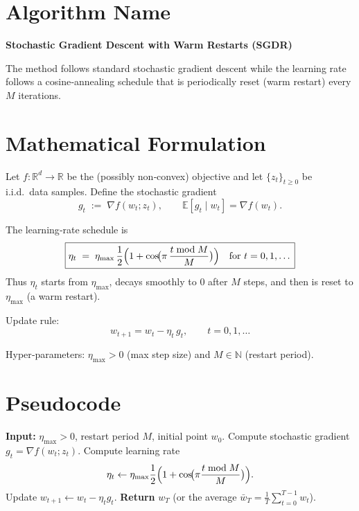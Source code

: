 \documentclass{article}
\newcommand{\EE}{\mathbb{E}}
\newcommand{\RR}{\mathbb{R}}
\begin{document}
\section*{Algorithm Name}
\textbf{Stochastic Gradient Descent with Warm Restarts (SGDR)}  

The method follows standard stochastic gradient descent while the learning rate follows a cosine‑annealing schedule that is periodically reset (warm restart) every $M$ iterations.

\section*{Mathematical Formulation}
Let $f:\RR^{d}\!\to\!\RR$ be the (possibly non‑convex) objective and let $\{z_t\}_{t\ge 0}$ be i.i.d.\ data samples.  
Define the stochastic gradient
\[
g_t \;:=\; \nabla f(w_t;z_t),\qquad 
\EE\!\left[g_t\mid w_t\right]=\nabla f(w_t).
\]

The learning‑rate schedule is
\begin{equation}
\boxed{
\eta_t \;=\; \eta_{\max}\,
\frac{1}{2}\Bigl(1+\cos\!\bigl(\pi\,\frac{t\bmod M}{M}\bigr)\Bigr)
\quad\text{for }t=0,1,\dots
}
\label{eq:eta}
\end{equation}
Thus $\eta_t$ starts from $\eta_{\max}$, decays smoothly to $0$ after $M$ steps, and then is reset to $\eta_{\max}$ (a warm restart).  

Update rule:
\begin{equation}
\boxed{
w_{t+1}=w_t-\eta_t\,g_t,\qquad t=0,1,\dots
}
\label{eq:update}
\end{equation}

Hyper‑parameters: $\eta_{\max}>0$ (max step size) and $M\in\mathbb{N}$ (restart period).

\section*{Pseudocode}
\begin{algorithm}[H]
\caption{SGDR}
\begin{algorithmic}[1]
\STATE \textbf{Input:} $\eta_{\max}>0$, restart period $M$, initial point $w_0$.
    \STATE Compute stochastic gradient $g_t=\nabla f(w_t;z_t)$.
    \STATE Compute learning rate 
    \[
    \eta_t\gets \eta_{\max}\frac{1}{2}\Bigl(1+\cos\!\bigl(\pi\frac{t\bmod M}{M}\bigr)\Bigr).
    \]
    \STATE Update $w_{t+1}\gets w_t-\eta_t g_t$.
\ENDFOR
\STATE \textbf{Return} $w_T$ (or the average $\bar w_T=\frac1T\sum_{t=0}^{T-1}w_t$).
\end{algorithmic}
\end{algorithm}
\end{document}
